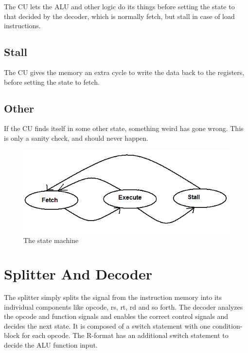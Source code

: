 The CU lets the ALU and other logic do its things before setting the state to
that decided by the decoder, which is normally fetch, but stall in case of load
instructions.

\subsection{Stall}

The CU gives the memory an extra cycle to write the data back to the registers,
before setting the state to fetch.

\subsection{Other}

If the CU finds itself in some other state, something weird has gone wrong.
This is only a sanity check, and should never happen.

\begin{figure}[ht] \centering
\includegraphics[scale=0.5]{figures/controlunitstatemachine.png}
\caption{\label{fig:stateMachine}The state machine} \end{figure}

\section{Splitter And Decoder}

The splitter simply splits the signal from the instruction memory into its
individual components like opcode, rs, rt, rd and so forth.  The decoder
analyzes the opcode and function signals and enables the correct control signals
and decides the next state.  It is composed of a switch statement with one
condition-block for each opcode.  The R-format has an additional switch
statement to decide the ALU function input.

